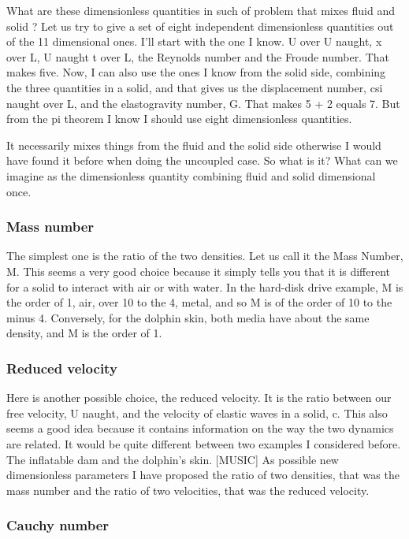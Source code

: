What are these dimensionless quantities
in such of problem that mixes fluid and solid ? Let us try to give a set of eight
independent dimensionless quantities out of the 11 dimensional ones. I'll start with the one I know. U over U naught, x over L, U naught t over L, the Reynolds number and the Froude  number. That makes five. Now, I  can also use the ones I
know from the solid side, combining the three quantities in a solid,
and that gives us the displacement number,
csi naught  over L, and the elastogravity   number, G. That makes 5 + 2 equals 7. But from the pi theorem I know I should
use eight dimensionless quantities. 

It necessarily mixes things from
the fluid and the solid side otherwise I would have found
it before when doing the uncoupled case. So what is it? What can we imagine as the dimensionless
quantity combining fluid and solid dimensional once.

\subsubsection{Mass number}

 The simplest one is the ratio
of the two densities. Let us call it the Mass Number, M. This seems a very good choice because it
simply tells you that it is different for a solid to interact with air or
with water. In the hard-disk drive example, M is the  order of 1,  air,
over 10 to the 4, metal, and so M is of the order of 10 to the minus 4. Conversely, for the dolphin skin, both media have about the same density,
and M is the order of 1. 

\subsubsection{Reduced velocity}

Here is another possible choice,
the reduced velocity. It is the ratio between our free velocity,
U naught, and the velocity of elastic waves in a solid, c. This also seems a good idea
because it contains information on the way the two dynamics are related. It would be quite different between
two examples I considered before. The inflatable dam and the dolphin's skin. [MUSIC] As possible new dimensionless parameters I
have proposed the ratio of two densities, that was the mass number and the ratio of
two velocities, that was the reduced  velocity.

\subsubsection{Cauchy number}

